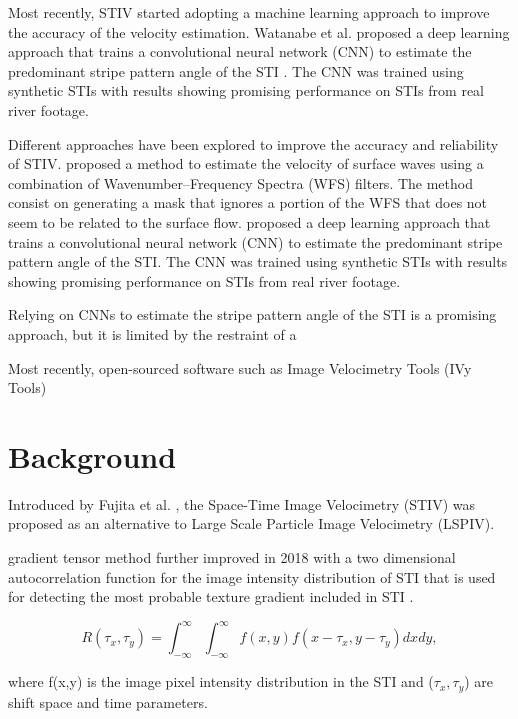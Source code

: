 \documentclass[12pt]{elsarticle}
\begin{document}
Most recently, STIV started adopting a machine learning approach to improve the accuracy of the velocity estimation. Watanabe et al. proposed a deep learning approach that trains a convolutional neural network (CNN) to estimate the predominant stripe pattern angle of the STI \cite{watanabe2021improving}. The CNN was trained using synthetic STIs with results showing promising performance on STIs from real river footage.

Different approaches have been explored to improve the accuracy and reliability of STIV. \cite{fujita2020application} proposed a method to estimate the velocity of surface waves using a combination of Wavenumber–Frequency Spectra (WFS) filters. The method consist on generating a mask that ignores a portion of the WFS that does not seem to be related to the surface flow. \cite{watanabe2021improving} proposed a deep learning approach that trains a convolutional neural network (CNN) to estimate the predominant stripe pattern angle of the STI. The CNN was trained using synthetic STIs with results showing promising performance on STIs from real river footage.

Relying on CNNs to estimate the stripe pattern angle of the STI is a promising approach, but it is limited by the restraint of a 

Most recently, open-sourced software such as Image Velocimetry Tools (IVy Tools) \cite{engel2025ivytools}


\section{Background}
Introduced by Fujita et al. \cite{fujita2007development}, the Space-Time Image Velocimetry (STIV) was proposed as an alternative to Large Scale Particle Image Velocimetry (LSPIV).

gradient tensor method  further improved in 2018 with a two dimensional autocorrelation function for the image intensity distribution of STI that is used for detecting the most probable texture gradient included in STI \cite{fujita2019efficient}.

\begin{equation}
    R(\tau_x, \tau_y) = \int_{-\infty}^{\infty}\int_{-\infty}^{\infty} f(x, y) f(x - \tau_x, y - \tau_y) dx dy,
\end{equation}

where f(x,y) is the image pixel intensity distribution in the STI and (\(\tau_x, \tau_y\)) are shift space and time parameters.
\end{document}
